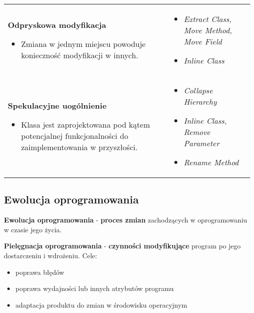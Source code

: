 \documentclass[../main.tex]{subfiles}
\begin{document}
\begin{table}[H]
\begin{center}
\begin{tabular}{ p{.35\linewidth} p{.65\linewidth}}
                \cmidrule(r){1-1}\cmidrule(l){2-2}
                \textbf{Odpryskowa modyfikacja}
                \begin{itemize}
                    \item Zmiana w jednym miejscu powoduje konieczność modyfikacji w innych.
                \end{itemize}
                &
                \begin{itemize}
                    \item \textit{Extract Class, Move Method, Move Field}
                    \item \textit{Inline Class}
                \end{itemize}
                \\

                \cmidrule(r){1-1}\cmidrule(l){2-2}
                \textbf{Spekulacyjne uogólnienie}
                \begin{itemize}
                    \item Klasa jest zaprojektowana pod kątem potencjalnej funkcjonalności do zaimplementowania w przyszłości.
                \end{itemize}
                &
                \begin{itemize}
                    \item \textit{Collapse Hierarchy}
                    \item \textit{Inline Class, Remove Parameter}
                    \item \textit{Rename Method}
                \end{itemize}
                \\
            \end{tabular}
        \end{center}
    \end{table}

    \subsection{Ewolucja oprogramowania}
    \textbf{Ewolucja oprogramowania} - \textbf{proces zmian} zachodzących w oprogramowaniu
    w czasie jego życia.

    \textbf{Pielęgnacja oprogramowania} - \textbf{czynności modyfikujące} program
    po jego dostarczeniu i wdrożeniu. Cele:
    \begin{itemize}
        \item poprawa błędów
        \item poprawa wydajności lub innych atrybutów programu
        \item adaptacja produktu do zmian w środowisku operacyjnym
    \end{itemize}
\end{document}
